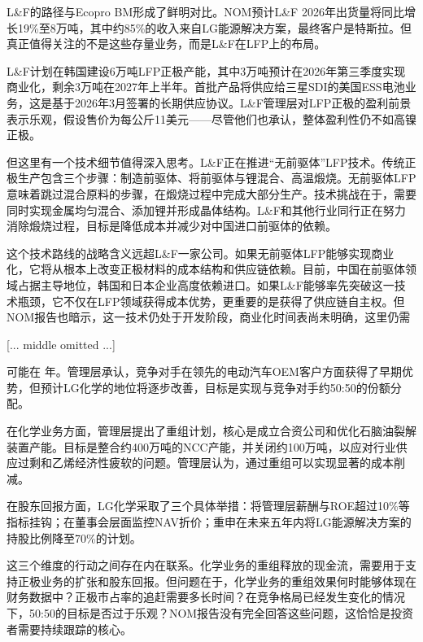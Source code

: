 \documentclass[11pt]{ctexart}
\begin{document}
L\&F的路径与Ecopro BM形成了鲜明对比。NOM预计L\&F 2026年出货量将同比增长19\%至8万吨，其中约85\%的收入来自LG能源解决方案，最终客户是特斯拉。但真正值得关注的不是这些存量业务，而是L\&F在LFP上的布局。

L\&F计划在韩国建设6万吨LFP正极产能，其中3万吨预计在2026年第三季度实现商业化，剩余3万吨在2027年上半年。首批产品将供应给三星SDI的美国ESS电池业务，这是基于2026年3月签署的长期供应协议。L\&F管理层对LFP正极的盈利前景表示乐观，假设售价为每公斤11美元——尽管他们也承认，整体盈利性仍不如高镍正极。

但这里有一个技术细节值得深入思考。L\&F正在推进“无前驱体”LFP技术。传统正极生产包含三个步骤：制造前驱体、将前驱体与锂混合、高温煅烧。无前驱体LFP意味着跳过混合原料的步骤，在煅烧过程中完成大部分生产。技术挑战在于，需要同时实现金属均匀混合、添加锂并形成晶体结构。L\&F和其他行业同行正在努力消除煅烧过程，目标是降低成本并减少对中国进口前驱体的依赖。

这个技术路线的战略含义远超L\&F一家公司。如果无前驱体LFP能够实现商业化，它将从根本上改变正极材料的成本结构和供应链依赖。目前，中国在前驱体领域占据主导地位，韩国和日本企业高度依赖进口。如果L\&F能够率先突破这一技术瓶颈，它不仅在LFP领域获得成本优势，更重要的是获得了供应链自主权。但NOM报告也暗示，这一技术仍处于开发阶段，商业化时间表尚未明确，这里仍需

[... middle omitted ...]

可能在 年。管理层承认，竞争对手在领先的电动汽车OEM客户方面获得了早期优势，但预计LG化学的地位将逐步改善，目标是实现与竞争对手约50:50的份额分配。

在化学业务方面，管理层提出了重组计划，核心是成立合资公司和优化石脑油裂解装置产能。目标是整合约400万吨的NCC产能，并关闭约100万吨，以应对行业供应过剩和乙烯经济性疲软的问题。管理层认为，通过重组可以实现显著的成本削减。

在股东回报方面，LG化学采取了三个具体举措：将管理层薪酬与ROE超过10\%等指标挂钩；在董事会层面监控NAV折价；重申在未来五年内将LG能源解决方案的持股比例降至70\%的计划。

这三个维度的行动之间存在内在联系。化学业务的重组释放的现金流，需要用于支持正极业务的扩张和股东回报。但问题在于，化学业务的重组效果何时能够体现在财务数据中？正极市占率的追赶需要多长时间？在竞争格局已经发生变化的情况下，50:50的目标是否过于乐观？NOM报告没有完全回答这些问题，这恰恰是投资者需要持续跟踪的核心。
\end{document}
